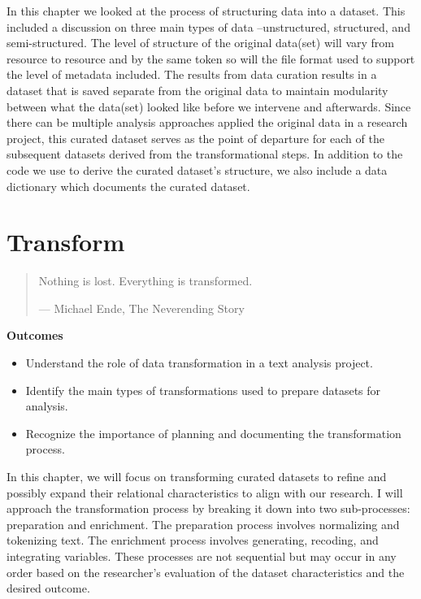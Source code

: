 \documentclass[
  letterpaper,
]{latex/krantz}
\providecommand{\tightlist}{%
  \setlength{\itemsep}{0pt}\setlength{\parskip}{0pt}}\usepackage{longtable,booktabs,array}
\theoremstyle{definition}
\theoremstyle{remark}
\begin{document}

In this chapter we looked at the process of structuring data into a
dataset. This included a discussion on three main types of data
--unstructured, structured, and semi-structured. The level of structure
of the original data(set) will vary from resource to resource and by the
same token so will the file format used to support the level of metadata
included. The results from data curation results in a dataset that is
saved separate from the original data to maintain modularity between
what the data(set) looked like before we intervene and afterwards. Since
there can be multiple analysis approaches applied the original data in a
research project, this curated dataset serves as the point of departure
for each of the subsequent datasets derived from the transformational
steps. In addition to the code we use to derive the curated dataset's
structure, we also include a data dictionary which documents the curated
dataset.

\chapter{Transform}\label{sec-transform-chapter}

\begin{quote}
Nothing is lost. Everything is transformed.

--- Michael Ende, The Neverending Story
\end{quote}

\begin{tcolorbox}[enhanced jigsaw, bottomrule=.15mm, leftrule=.75mm, toprule=.15mm, breakable, colframe=quarto-callout-color-frame, arc=.35mm, left=2mm, rightrule=.15mm, opacityback=0, colback=white]

\textbf{ Outcomes}

\begin{itemize}
\tightlist
\item
  Understand the role of data transformation in a text analysis project.
\item
  Identify the main types of transformations used to prepare datasets
  for analysis.
\item
  Recognize the importance of planning and documenting the
  transformation process.
\end{itemize}

\end{tcolorbox}

In this chapter, we will focus on transforming curated datasets to
refine and possibly expand their relational characteristics to align
with our research. I will approach the transformation process by
breaking it down into two sub-processes: preparation and enrichment. The
preparation process involves normalizing and tokenizing text. The
enrichment process involves generating, recoding, and integrating
variables. These processes are not sequential but may occur in any order
based on the researcher's evaluation of the dataset characteristics and
the desired outcome.
\end{document}
